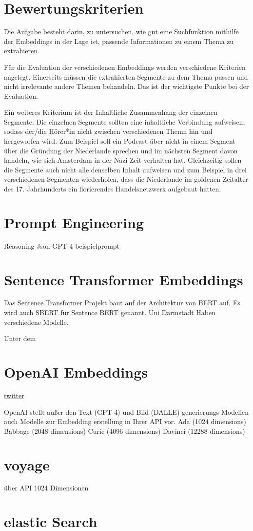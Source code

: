 \section{Bewertungskriterien}


Die Aufgabe besteht darin, zu untersuchen, wie gut eine Suchfunktion mithilfe der Embeddings in der Lage ist, passende Informationen zu einem Thema zu extrahieren.

Für die Evaluation der verschiedenen Embeddings werden verschiedene Kriterien angelegt.
Einerseits müssen die extrahierten Segmente zu dem Thema passen und nicht irrelevante andere Themen behandeln.
Das ist der wichtigste Punkte bei der Evaluation.

Ein weiteres Kriterium ist der Inhaltliche Zusammenhang der einzelnen Segmente.
Die einzelnen Segmente sollten eine inhaltliche Verbindung aufweisen, sodass der/die Hörer*in nicht zwischen verschiedenen Themn hin und hergeworfen wird.
Zum Beispiel soll ein Podcast über  nicht in einem Segment über die Gründung der Niederlande sprechen und im nächsten Segment davon handeln, wie sich Amsterdam in der Nazi Zeit verhalten hat.
Gleichzeitig sollen die Segmente auch nicht alle denselben Inhalt aufweisen und zum Beispiel in drei verschiedenen Segmenten wiederholen, dass die Niederlande im goldenen Zeitalter des 17. Jahrhunderts ein florierendes Handelsnetzwerk aufgebaut hatten.

\section{Prompt Engineering}

Reasoning
Json
GPT-4
beispielprompt


\section{Sentence Transformer Embeddings}

Das Sentence Transformer Projekt baut auf der Architektur von BERT auf. 
Es wird auch SBERT für Sentence BERT genannt. 
Uni Darmstadt
Haben verschiedene Modelle.

Unter dem 


\section{OpenAI Embeddings}

\href{https://twitter.com/Nils_Reimers/status/1487014195568775173}{twitter}

OpenAI stellt außer den Text (GPT-4) und Bild (DALLE) generierungs Modellen auch Modelle zur Embedding erstellung in Ihrer API vor.
Ada (1024 dimensions)
Babbage (2048 dimensions)
Curie (4096 dimensions)
Davinci (12288 dimensions)

\section{voyage}

über API
1024 Dimensionen

\section{elastic Search}
